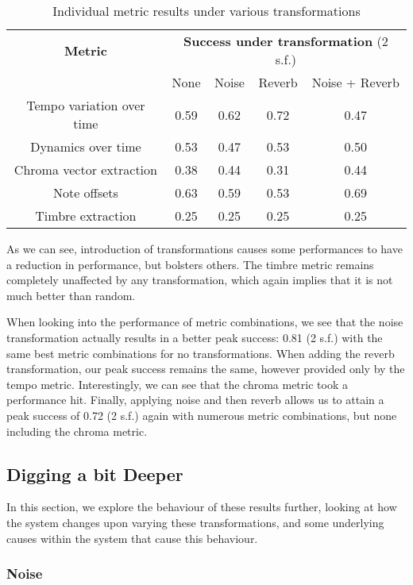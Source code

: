 \documentclass[oneside, class=book, 12pt, crop=false]{standalone}
\begin{document}
\begin{table}[h]
    \centering
    \begin{tabular}{ccccc}
      \textbf{Metric}&\multicolumn{4}{c}{\textbf{Success under transformation} (2 s.f.)}\\
      &None&Noise&Reverb&Noise + Reverb\\
      \midrule[0.15em]
      Tempo variation over time&0.59&0.62&0.72&0.47\\
      Dynamics over time&0.53&0.47&0.53&0.50\\
      Chroma vector extraction&0.38&0.44&0.31&0.44\\
      Note offsets&0.63&0.59&0.53&0.69\\
      Timbre extraction&0.25&0.25&0.25&0.25\\
        
    \end{tabular}
    \caption{Individual metric results under various transformations}
    \label{table:transformation results}
\end{table}



As we can see, introduction of transformations causes some performances to have a reduction in performance, but bolsters others. The timbre metric remains completely unaffected by any transformation, which again implies that it is not much better than random.

When looking into the performance of metric combinations, we see that the noise transformation actually results in a better peak success: 0.81 (2 s.f.) with the same best metric combinations for no transformations. When adding the reverb transformation, our peak success remains the same, however provided only by the tempo metric. Interestingly, we can see that the chroma metric took a performance hit. Finally, applying noise and then reverb allows us to attain a peak success of 0.72 (2 s.f.) again with numerous metric combinations, but none including the chroma metric.

\subsection{Digging a bit Deeper}

In this section, we explore the behaviour of these results further, looking at how the system changes upon varying these transformations, and some underlying causes within the system that cause this behaviour.

\subsubsection{Noise}
\end{document}
